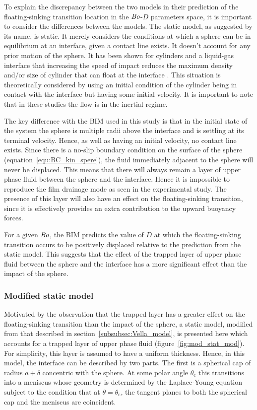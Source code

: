 \documentclass[12pt]{article}
\newcommand\Bo{\mbox{\textit{Bo}}}  %
\begin{document}
To explain the discrepancy between the two models in their prediction of the floating-sinking transition location in the $\Bo$-$D$ parameters space, it is important to consider the differences between the models. The static model, as suggested by its name, is static. It merely considers the conditions at which a sphere can be in equilibrium at an interface, given a contact line exists. It doesn't account for any prior motion of the sphere. It has been shown for cylinders and a liquid-gas interface that increasing the speed of impact reduces the maximum density and/or size of cylinder that can float at the interface \citet{Vella07, Vella10}. This situation is theoretically considered by using an initial condition of the cylinder being in contact with the interface but having some initial velocity. It is important to note that in these studies the flow is in the inertial regime.

The key difference with the BIM used in this study is that in the initial state of the system the sphere is multiple radii above the interface and is settling at its terminal velocity. Hence, as well as having an initial velocity, no contact line exists. Since there is a no-slip boundary condition on the surface of the sphere (equation~\ref{equ:BC_kin_spere}), the fluid immediately adjacent to the sphere will never be displaced. This means that there will always remain a layer of upper phase fluid between the sphere and the interface. Hence it is impossible to reproduce the film drainage mode as seen in the experimental study. The presence of this layer will also have an effect on the floating-sinking transition, since it is effectively provides an extra contribution to the upward buoyancy forces. 

For a given $\Bo$, the BIM predicts the value of $D$ at which the floating-sinking transition occurs to be positively displaced relative to the prediction from the static model. This suggests that the effect of the trapped layer of upper phase fluid between the sphere and the interface has a more significant effect than the impact of the sphere.

\subsubsection{Modified static model}
\label{subsubsec:mod_stat_mod}

Motivated by the observation that the trapped layer has a greater effect on the floating-sinking transition than the impact of the sphere, a static model, modified from that described in section~\ref{subsubsec:Vella_model}, is presented here which accounts for a trapped layer of upper phase fluid (figure~\ref{fig:mod_stat_mod}). For simplicity, this layer is assumed to have a uniform thickness. Hence, in this model, the interface can be described by two parts. The first is a spherical cap of radius $a + \delta$ concentric with the sphere. At some polar angle $\theta_{\text{c}}$ this transitions into a meniscus whose geometry is determined by the Laplace-Young equation subject to the condition that at $\theta = \theta_{\text{c}}$, the tangent planes to both the spherical cap and the meniscus are coincident. 
\end{document}
